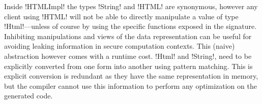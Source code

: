 \documentclass[manuscript,screen,nonacm]{acmart}
\begin{document}
Inside !HTMLImpl! the types !String! and !HTML! are synonymous, however any client using !HTML! will not be able to directly manipulate a value of type !Html!---unless of course by using the specific functions exposed in the signature. Inhibiting manipulations and views of the data representation can be useful for avoiding leaking information in secure computation contexts. This (naive) abstraction however comes with a runtime cost. !Html! and !String!, need to be explicitly converted from one form into another using pattern matching. This is explicit conversion is redundant as they have the same representation in memory, but the compiler cannot use this information to perform any optimization on the generated code.





\end{document}
